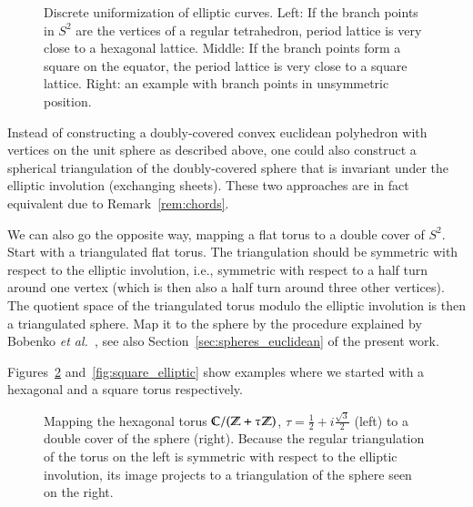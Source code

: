 \documentclass[Thesis]{subfiles}
\begin{document}
\begin{figure}
\centering
{}
\caption{Discrete uniformization of elliptic curves. Left: If the
  branch points in $S^{2}$ are the vertices of a regular tetrahedron,
  period lattice is very close to a hexagonal lattice. Middle: If the
  branch points form a square on the equator, the period lattice is
  very close to a square lattice. Right: an example with branch points
  in unsymmetric position.}
\label{fig:p_functions}
\end{figure}

\begin{remark}
  Instead of constructing a doubly-covered convex euclidean polyhedron
  with vertices on the unit sphere as described above, one could also
  construct a spherical triangulation of the doubly-covered sphere
  that is invariant under the elliptic involution (exchanging
  sheets). These two approaches are in fact equivalent due to
  Remark~\ref{rem:chords}. 
\end{remark}

 We can
also go the opposite way, mapping a flat torus to a double cover of
$S^{2}$. Start with a triangulated flat torus. The triangulation
should be symmetric with respect to the elliptic involution, i.e.,
symmetric with respect to a half turn around one vertex (which is then
also a half turn around three other vertices). The quotient space of
the triangulated torus modulo the elliptic involution is then a
triangulated sphere. Map it to the sphere by the procedure explained
by Bobenko {\it et al.}\ \cite[Section 3.2]{BPS2015:dconf}, see also
Section~\ref{sec:spheres_euclidean} of the present work.

Figures~\ref{fig:wente_elliptic} and~\ref{fig:square_elliptic} show
examples where we started with a hexagonal and a square torus
respectively. 

\begin{figure}
\centering
{}
\caption{Mapping the hexagonal torus $\mathbb C/(\mathbb Z+\tau\mathbb Z)$,
  $\tau=\tfrac{1}{2}+i\tfrac{\sqrt 3}{2}$ (left) to a double cover of
  the sphere (right). Because the regular triangulation of the torus
  on the left is symmetric with respect to the elliptic involution,
  its image projects to a triangulation of the sphere seen on the right.} 
\label{fig:wente_elliptic}
\end{figure}
\end{document}

